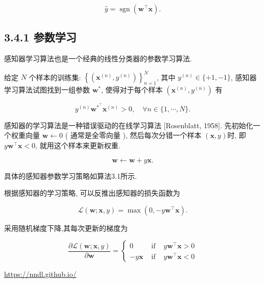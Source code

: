 \documentclass[10pt]{article}
\begin{document}
\begin{equation*}
\hat{y}=\operatorname{sgn}\left(\boldsymbol{w}^{\top} \boldsymbol{x}\right) . \tag{3.54}
\end{equation*}


\subsection*{3.4.1 参数学习}
感知器学习算法也是一个经典的线性分类器的参数学习算法.

给定 $N$ 个样本的训练集: $\left\{\left(\boldsymbol{x}^{(n)}, y^{(n)}\right)\right\}_{n=1}^{N}$, 其中 $y^{(n)} \in\{+1,-1\}$, 感知器学习算法试图找到一组参数 $\boldsymbol{w}^{*}$, 使得对于每个样本 $\left(\boldsymbol{x}^{(n)}, y^{(n)}\right)$ 有


\begin{equation*}
y^{(n)} \boldsymbol{w}^{*^{\top}} \boldsymbol{x}^{(n)}>0, \quad \forall n \in\{1, \cdots, N\} . \tag{3.55}
\end{equation*}


感知器的学习算法是一种错误驱动的在线学习算法 [Rosenblatt, 1958]. 先初始化一个权重向量 $\boldsymbol{w} \leftarrow 0$ ( 通常是全零向量 ), 然后每次分错一个样本 $(\boldsymbol{x}, y)$时, 即 $y \boldsymbol{w}^{\top} \boldsymbol{x}<0$, 就用这个样本来更新权重.


\begin{equation*}
\boldsymbol{w} \leftarrow \boldsymbol{w}+y \boldsymbol{x} . \tag{3.56}
\end{equation*}


具体的感知器参数学习策略如算法3.1所示.

根据感知器的学习策略, 可以反推出感知器的损失函数为


\begin{equation*}
\mathcal{L}(\boldsymbol{w} ; \boldsymbol{x}, y)=\max \left(0,-y \boldsymbol{w}^{\top} \boldsymbol{x}\right) . \tag{3.57}
\end{equation*}


采用随机梯度下降,其每次更新的梯度为

\[
\frac{\partial \mathcal{L}(\boldsymbol{w} ; \boldsymbol{x}, y)}{\partial \boldsymbol{w}}=\left\{\begin{array}{lll}
0 & \text { if } & y \boldsymbol{w}^{\top} \boldsymbol{x}>0  \tag{3.58}\\
-y \boldsymbol{x} & \text { if } & y \boldsymbol{w}^{\top} \boldsymbol{x}<0
\end{array}\right.
\]

\href{https://nndl.github.io/}{https://nndl.github.io/}
\end{document}
